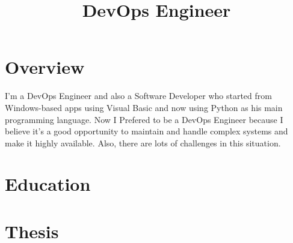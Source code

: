\documentclass[11pt,a4paper,sans]{moderncv}        %
\title{DevOps Engineer}                               %
\begin{document}
\makecvtitle

\section{Overview}
I'm a DevOps Engineer and also a Software Developer who started from Windows-based apps using Visual Basic and now using Python as his main programming language. Now I Prefered to be a DevOps Engineer because I believe it’s a good opportunity to maintain and handle complex systems and make it highly available. Also, there are lots of challenges in this situation. 
\section{Education}

\section{Thesis}
\end{document}
